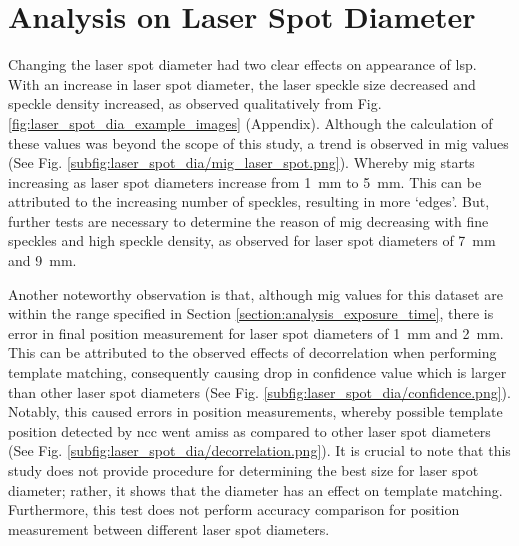 \section{Analysis on Laser Spot Diameter}
    Changing the laser spot diameter had two clear effects on appearance of \gls{lsp}. With an increase in laser spot diameter, the laser speckle size decreased and speckle density increased, as observed qualitatively from Fig. \ref{fig:laser_spot_dia_example_images} (Appendix). Although the calculation of these values was beyond the scope of this study, a trend is observed in \gls{mig} values (See Fig. \ref{subfig:laser_spot_dia/mig_laser_spot.png}). Whereby \gls{mig} starts increasing as laser spot diameters increase from \SI{1}{\milli\meter} to \SI{5}{\milli\meter}. This can be attributed to the increasing number of speckles, resulting in more `edges'. But, further tests are necessary to determine the reason of \gls{mig} decreasing with fine speckles and high speckle density, as observed for laser spot diameters of \SI{7}{\milli\meter} and \SI{9}{\milli\meter}.
    
    \vspace{5mm}
    \noindent Another noteworthy observation is that, although \gls{mig} values for this dataset are within the range specified in Section \ref{section:analysis_exposure_time}, there is error in final position measurement for laser spot diameters of \SI{1}{\milli\meter} and \SI{2}{\milli\meter}. This can be attributed to the observed effects of decorrelation when performing template matching, consequently causing drop in confidence value which is larger than other laser spot diameters (See Fig. \ref{subfig:laser_spot_dia/confidence.png}). Notably, this caused errors in position measurements, whereby possible template position detected by \gls{ncc} went amiss as compared to other laser spot diameters (See Fig. \ref{subfig:laser_spot_dia/decorrelation.png}). It is crucial to note that this study does not provide procedure for determining the best size for laser spot diameter; rather, it shows that the diameter has an effect on template matching. Furthermore, this test does not perform accuracy comparison for position measurement between different laser spot diameters.    
    
    


